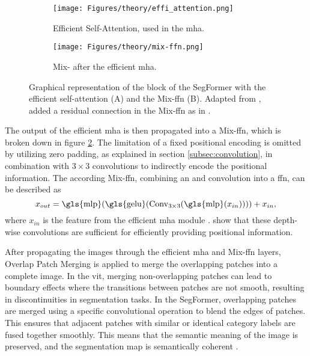 \begin{figure}[htb]
    \centering
    \begin{subfigure}{.45\textwidth}
        \centering
        \texttt{[image: Figures/theory/effi\_attention.png]}
        \caption{Efficient Self-Attention, used in the \gls{mha}.}
        \label{fig:effi_attention}
    \end{subfigure}
    \begin{subfigure}{.45\textwidth}
        \centering
        \texttt{[image: Figures/theory/mix-ffn.png]}
        \caption{Mix- after the efficient \gls{mha}.}
        \label{fig:mix-ffn}
    \end{subfigure}
    \caption[ Block of the SegFormer]{Graphical representation of the  block of the SegFormer with the efficient self-attention (A) and the Mix-\gls{ffn} (B). Adapted from \textcite{Wang.Wang.ea2023}, added a residual connection in the Mix-\gls{ffn} as in \textcite{Lin.Cheng.ea2023}.}
    \label{fig:segformer_block}
\end{figure}

The output of the efficient \gls{mha} is then propagated into a Mix-\gls{ffn}, which is broken down in figure \ref{fig:mix-ffn}. The limitation of a fixed positional encoding is omitted by utilizing zero padding, as explained in section \ref{subsec:convolution}, in combination with \( 3 \times 3 \) convolutions to indirectly encode the positional information. The according Mix-\gls{ffn}, combining an and convolution into a \gls{ffn}, can be described as
\begin{equation}
    x_{out} = \text{\gls{mlp}}(\text{\gls{gelu}}(\text{Conv}_{3 \times 3}(\text{\gls{mlp}}(x_{in})))) + x_{in},
\end{equation}
where \( x_{in} \) is the feature from the efficient \gls{mha} module \autocite{Lin.Cheng.ea2023,Wang.Wang.ea2023,Xie.Wang.ea2021}. \textcite{Xie.Wang.ea2021} show that these depth-wise convolutions are sufficient for efficiently providing positional information.

After propagating the images through the efficient \gls{mha} and Mix-\gls{ffn} layers, Overlap Patch Merging is applied to merge the overlapping patches into a complete image. In the \gls{vit}, merging non-overlapping patches can lead to boundary effects where the transitions between patches are not smooth, resulting in discontinuities in segmentation tasks. In the SegFormer, overlapping patches are merged using a specific convolutional operation to blend the edges of patches. This ensures that adjacent patches with similar or identical category labels are fused together smoothly. This means that the semantic meaning of the image is preserved, and the segmentation map is semantically coherent \autocite{Lin.Cheng.ea2023,Xie.Wang.ea2021}.

